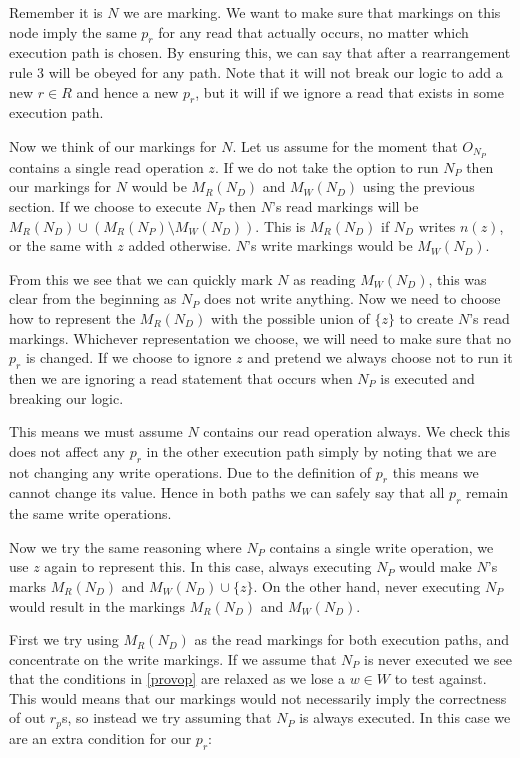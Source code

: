\documentclass{report}
\begin{document}
Remember it is $N$ we are marking. We want to make sure that markings on this node imply the same $p_r$ for any read that actually occurs, no matter
which execution path is chosen. By ensuring this, we can say that after a rearrangement rule 3 will be obeyed for any path. Note that it will not
break our logic to add a new $r \in R$ and hence a new $p_r$, but it will if we ignore a read that exists in some execution path.

Now we think of our markings for $N$. Let us assume for the moment that $O_{N_P}$ contains a single read operation $z$. If we do not take
the option to run $N_P$ then our markings for $N$ would be $M_R(N_D)$ and $M_W(N_D)$ using the previous section. If we choose to execute $N_P$ then $N$'s
read markings will be $M_R(N_D) \cup (M_R(N_P) \setminus M_W(N_D))$. This is $M_R(N_D)$ if $N_D$ writes $n(z)$, or the same with $z$ added otherwise.
$N$'s write markings would be $M_W(N_D)$.

From this we see that we can quickly mark $N$ as reading $M_W(N_D)$, this was clear from the beginning as $N_P$ does not write anything. Now we need to choose
how to represent the $M_R(N_D)$ with the possible union of $\{z\}$ to create $N$'s read markings. Whichever representation we choose, we will need to make sure
that no $p_r$ is changed. If we choose to ignore $z$ and pretend we always choose not to run it then we are ignoring a read statement that occurs when $N_P$ is
executed and breaking our logic.

This means we must assume $N$ contains our read operation always. We check this does not affect any $p_r$ in the other execution path simply by noting that we
are not changing any write operations. Due to the definition of $p_r$ this means we cannot change its value. Hence in both paths we can safely say that all
$p_r$ remain the same write operations.

Now we try the same reasoning where $N_P$ contains a single write operation, we use $z$ again to represent this. In this case, always executing $N_P$ would
make $N$'s marks $M_R(N_D)$ and $M_W(N_D) \cup \{ z \}$. On the other hand, never executing $N_P$ would result in the markings $M_R(N_D)$ and $M_W(N_D)$.

First we try using $M_R(N_D)$ as the read markings for both execution paths, and concentrate on the write markings. If we assume that $N_P$ is never executed
we see that the conditions in \eqref{provop} are relaxed as we lose a $w \in W$ to test against. This would means that our markings would not necessarily imply
the correctness of out $r_p$s, so instead we try assuming that $N_P$ is always executed. In this case we are an extra condition for our $p_r$:
\end{document}
